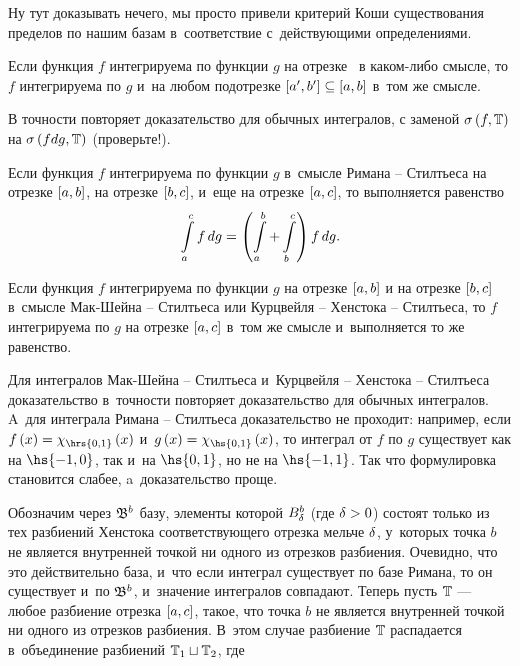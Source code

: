 \documentclass[draft]{article}
\begin{document}
\pr

Ну тут доказывать нечего, мы просто привели критерий Коши
существования пределов по нашим базам в~соответствие с~действующими
определениями.

\prut

\bigskip


Если функция $f$ интегрируема по функции $g$ на отрезке \ab\ в
каком-либо смысле, то $f$ интегрируема по $g$ и~на любом подотрезке
$\seg[a',b']\subseteq\segab$ в~том же смысле.

\pr

В точности повторяет доказательство для обычных интегралов, с
заменой $\isfT$ на $\isfdgT$ (проверьте!).

\prut

\bigskip


Если функция $f$ интегрируема по функции $g$ в~смысле Римана --
Стилтьеса на отрезке $\seg[a,b]$, на отрезке $\seg[b,c]$, и~еще на
отрезке $\seg[a,c]$, то выполняется равенство
$$\intd[a,c]f,g=\at(\int\limits_a^b+\int\limits_b^c)f\,dg.$$

Если функция $f$ интегрируема по функции $g$ на отрезке $\seg[a,b]$
и на отрезке $\seg[b,c]$ в~смысле Мак-Шейна -- Стилтьеса или
Курцвейля -- Хенстока -- Стилтьеса, то $f$ интегрируема по $g$ на
отрезке $\seg[a,c]$ в~том же смысле и~выполняется то же равенство.

\pr

Для интегралов Мак-Шейна -- Стилтьеса и~Курцвейля -- Хенстока --
Стилтьеса доказательство в~точности повторяет доказательство для
обычных интегралов. A~для интеграла Римана -- Стилтьеса
доказательство не проходит: например, если
$f\atx=\chi_{\hrs{0,1}}\atx$ и~$g\atx=\chi_{\hs{0,1}}\atx$, то
интеграл от $f$ по $g$ существует как на $\hs{-1,0}$, так и~на
$\hs{0, 1}$, но не на $\hs{-1,1}$. Так что формулировка становится
слабее, a~доказательство проще.

\smallskip

Обозначим через $\mathfrak{B}^b$ базу, элементы которой $B^b_{ \delta}$ (где
$\delta > 0$) состоят только из тех разбиений Хенстока соответствующего
отрезка мельче $\delta$, у~которых точка $b$ не является внутренней
точкой ни одного из отрезков разбиения. Очевидно, что это
действительно база, и~что если интеграл существует по базе Римана,
то он существует и~по $\mathfrak{B}^b$, и~значение интегралов совпадают.
Теперь пусть $\mathbb{T}$ --- любое разбиение отрезка $\seg[a,c]$, такое,
что точка $b$ не является внутренней точкой ни одного из отрезков
разбиения. В~этом случае разбиение $\mathbb{T}$ распадается в~объединение
разбиений $\mathbb{T}_1\sqcup\mathbb{T}_2$, где
\end{document}

